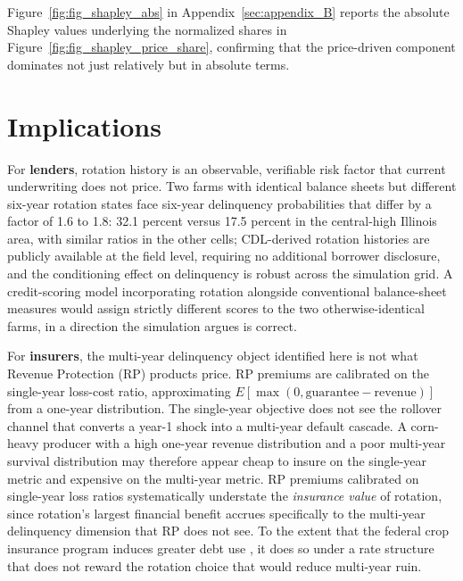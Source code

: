 \documentclass[11pt,letterpaper]{article}
\theoremstyle{remark}
\begin{document}
Figure~\ref{fig:fig_shapley_abs} in Appendix~\ref{sec:appendix_B} reports the absolute Shapley values underlying the normalized shares in Figure~\ref{fig:fig_shapley_price_share}, confirming that the price-driven component dominates not just relatively but in absolute terms.
 
\section{\label{sec:implications}Implications}
 
For \textbf{lenders}, rotation history is an observable, verifiable risk factor that current underwriting does not price. Two farms with identical balance sheets but different six-year rotation states face six-year delinquency probabilities that differ by a factor of 1.6 to 1.8: 32.1 percent versus 17.5 percent in the central-high Illinois area, with similar ratios in the other cells; CDL-derived rotation histories are publicly available at the field level, requiring no additional borrower disclosure, and the conditioning effect on delinquency is robust across the simulation grid. A credit-scoring model incorporating rotation alongside conventional balance-sheet measures would assign strictly different scores to the two otherwise-identical farms, in a direction the simulation argues is correct.
 
For \textbf{insurers}, the multi-year delinquency object identified here is not what Revenue Protection (RP) products price. RP premiums are calibrated on the single-year loss-cost ratio, approximating $E[\max(0, \text{guarantee} - \text{revenue})]$ from a one-year distribution. The single-year objective does not see the rollover channel that converts a year-1 shock into a multi-year default cascade. A corn-heavy producer with a high one-year revenue distribution and a poor multi-year survival distribution may therefore appear cheap to insure on the single-year metric and expensive on the multi-year metric. RP premiums calibrated on single-year loss ratios systematically understate the \textit{insurance value} of rotation, since rotation's largest financial benefit accrues specifically to the multi-year delinquency dimension that RP does not see. To the extent that the federal crop insurance program induces greater debt use \citep{IfftKuethe2013}, it does so under a rate structure that does not reward the rotation choice that would reduce multi-year ruin.
 
\end{document}
